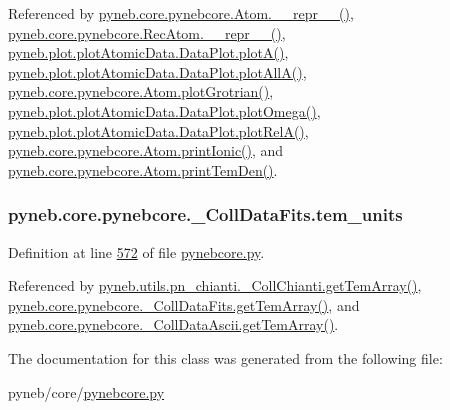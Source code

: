 Referenced by \hyperlink{pynebcore_8py_source_l02544}{pyneb.\+core.\+pynebcore.\+Atom.\+\_\+\+\_\+repr\+\_\+\+\_\+()}, \hyperlink{pynebcore_8py_source_l03032}{pyneb.\+core.\+pynebcore.\+Rec\+Atom.\+\_\+\+\_\+repr\+\_\+\+\_\+()}, \hyperlink{plot_atomic_data_8py_source_l00116}{pyneb.\+plot.\+plot\+Atomic\+Data.\+Data\+Plot.\+plot\+A()}, \hyperlink{plot_atomic_data_8py_source_l00188}{pyneb.\+plot.\+plot\+Atomic\+Data.\+Data\+Plot.\+plot\+All\+A()}, \hyperlink{pynebcore_8py_source_l02372}{pyneb.\+core.\+pynebcore.\+Atom.\+plot\+Grotrian()}, \hyperlink{plot_atomic_data_8py_source_l00372}{pyneb.\+plot.\+plot\+Atomic\+Data.\+Data\+Plot.\+plot\+Omega()}, \hyperlink{plot_atomic_data_8py_source_l00261}{pyneb.\+plot.\+plot\+Atomic\+Data.\+Data\+Plot.\+plot\+Rel\+A()}, \hyperlink{pynebcore_8py_source_l02167}{pyneb.\+core.\+pynebcore.\+Atom.\+print\+Ionic()}, and \hyperlink{pynebcore_8py_source_l02253}{pyneb.\+core.\+pynebcore.\+Atom.\+print\+Tem\+Den()}.

\hypertarget{classpyneb_1_1core_1_1pynebcore_1_1___coll_data_fits_a0ec412b766393f099d604527da57c565}{}
\subsubsection[{tem\+\_\+units}]{\setlength{\rightskip}{0pt plus 5cm}pyneb.\+core.\+pynebcore.\+\_\+\+Coll\+Data\+Fits.\+tem\+\_\+units}\label{classpyneb_1_1core_1_1pynebcore_1_1___coll_data_fits_a0ec412b766393f099d604527da57c565}


Definition at line \hyperlink{pynebcore_8py_source_l00572}{572} of file \hyperlink{pynebcore_8py_source}{pynebcore.\+py}.



Referenced by \hyperlink{pn__chianti_8py_source_l00521}{pyneb.\+utils.\+pn\+\_\+chianti.\+\_\+\+Coll\+Chianti.\+get\+Tem\+Array()}, \hyperlink{pynebcore_8py_source_l00880}{pyneb.\+core.\+pynebcore.\+\_\+\+Coll\+Data\+Fits.\+get\+Tem\+Array()}, and \hyperlink{pynebcore_8py_source_l01110}{pyneb.\+core.\+pynebcore.\+\_\+\+Coll\+Data\+Ascii.\+get\+Tem\+Array()}.



The documentation for this class was generated from the following file\+:\begin{DoxyCompactItemize}
\item 
pyneb/core/\hyperlink{pynebcore_8py}{pynebcore.\+py}\end{DoxyCompactItemize}
